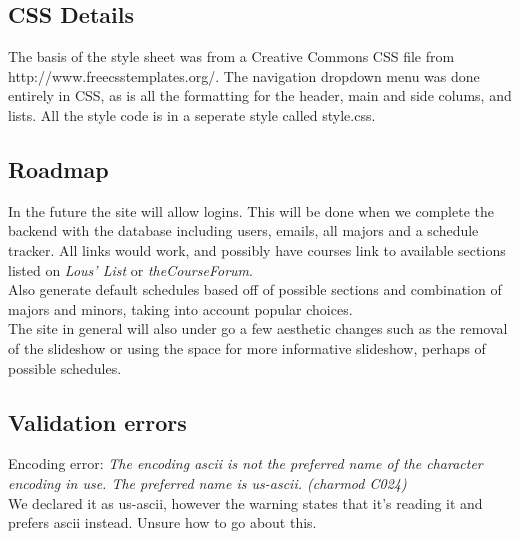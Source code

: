 \documentclass{article}
\begin{document}
\begin{doublespace}
\subsection*{CSS Details}
The basis of the style sheet was from a Creative Commons CSS file from http://www.freecsstemplates.org/.
The navigation dropdown menu was done entirely in CSS, as is all the formatting for the header, main and side colums, and lists.
All the style code is in a seperate style called style.css.

\subsection*{Roadmap}
In the future the site will allow logins. This will be done when we complete the backend with the database including users, emails, all majors and a schedule tracker. All links would work, and possibly have courses link to available sections listed on \emph{Lous' List} or \emph{theCourseForum}.\\
Also generate default schedules based off of possible sections and combination of majors and minors, taking into account popular choices.\\
The site in general will also under go a few aesthetic changes such as the removal of the slideshow or using the space for more informative slideshow, perhaps of possible schedules.

\subsection*{Validation errors}
Encoding error: \emph{The encoding ascii is not the preferred name of the character encoding in use. The preferred name is us-ascii. (charmod C024)}\\
We declared it as us-ascii, however the warning states that it's reading it and prefers ascii instead. Unsure how to go about this.

\end{doublespace}
\end{document}
